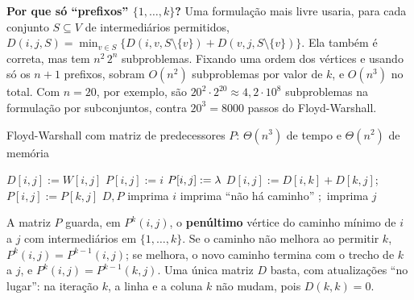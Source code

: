 \begin{figura}
\end{figura}

\textbf{Por que só ``prefixos'' $\{1,\dots,k\}$?} Uma formulação mais livre usaria, para cada conjunto $S\subseteq V$ de intermediários permitidos, $D(i,j,S)=\min_{v\in S}\{D(i,v,S\setminus\{v\})+D(v,j,S\setminus\{v\})\}$. Ela também é correta, mas tem $n^2\,2^n$ subproblemas. Fixando uma ordem dos vértices e usando só os $n+1$ prefixos, sobram $O(n^2)$ subproblemas por valor de $k$, e $O(n^3)$ no total. Com $n=20$, por exemplo, são $20^2\cdot2^{20}\approx4{,}2\cdot10^8$ subproblemas na formulação por subconjuntos, contra $20^3=8000$ passos do Floyd-Warshall.

\begin{pseudo}{Floyd-Warshall com matriz de predecessores $P$: $\Theta(n^3)$ de tempo e $\Theta(n^2)$ de memória}
\begin{algorithmic}
    \State $D[i,j]:=W[i,j]$
     \State $P[i,j]:=i$ \Else \State $P[i,j]:=\lambda$ \EndIf
  \EndFor
   
          \State $D[i,j]:=D[i,k]+D[k,j]$;\ $P[i,j]:=P[k,j]$ 
        \EndIf
      \EndFor
    \EndFor
  \EndFor
  \State \Return $D,P$
\EndFunction
{}
   \State imprima $i$
   \State imprima ``não há caminho''
  \Else \State {};\ imprima $j$
  \EndIf
\EndProcedure
\end{algorithmic}
\end{pseudo}
A matriz $P$ guarda, em $P^k(i,j)$, o \textbf{penúltimo} vértice do caminho mínimo de $i$ a $j$ com intermediários em $\{1,\dots,k\}$. Se o caminho não melhora ao permitir $k$, $P^k(i,j)=P^{k-1}(i,j)$; se melhora, o novo caminho termina com o trecho de $k$ a $j$, e $P^k(i,j)=P^{k-1}(k,j)$. Uma única matriz $D$ basta, com atualizações ``no lugar'': na iteração $k$, a linha e a coluna $k$ não mudam, pois $D(k,k)=0$.


